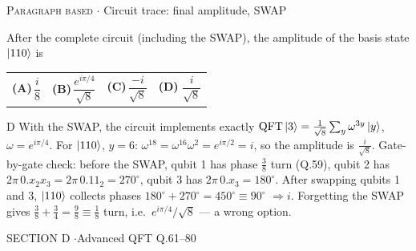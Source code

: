 \documentclass[11pt,a4paper]{article}
\newcommand{\optlabel}[1]{\textbf{(#1)}}
\newcommand{\correctlabel}[1]{\textcolor{okgreen}{\textbf{(#1)}\,\ding{51}}}
\newenvironment{qitem}[1]{\begin{list}{}{\setlength{\leftmargin}{3.3em}\setlength{\labelwidth}{3.1em}%
  \setlength{\labelsep}{0.2em}\setlength{\topsep}{3pt}\setlength{\parsep}{3pt}}\item[\textbf{Q.#1}\hfill]}{\end{list}}
\newcommand{\qsep}{\par\vspace{2pt}{\color{black!15}\hrule}\vspace{4pt}}
\newcommand{\qmeta}[2]{{\footnotesize\color{black!60}\textsc{#1} \;$\cdot$\; #2}\par}
\begin{document}
\begin{qitem}{60}
\qmeta{Paragraph based}{Circuit trace: final amplitude, SWAP}
After the complete circuit (including the SWAP), the amplitude of the basis state $\ket{110}$ is
\par\smallskip\noindent\begin{tabularx}{\linewidth}{@{}*{4}{L}@{}}
\optlabel{A}\,$\dfrac{i}{8}$ & \optlabel{B}\,$\dfrac{e^{i\pi/4}}{\sqrt8}$ & \optlabel{C}\,$\dfrac{-i}{\sqrt8}$ & \correctlabel{D}\,$\dfrac{i}{\sqrt8}$
\end{tabularx}
\end{qitem}
\begin{solbox}{D}
With the SWAP, the circuit implements exactly $\mathrm{QFT}\ket{3} = \frac{1}{\sqrt8}\sum_y\omega^{3y}\ket y$, $\omega = e^{i\pi/4}$.
For $\ket{110}$, $y = 6$: $\omega^{18} = \omega^{16}\omega^{2} = e^{i\pi/2} = i$, so the amplitude is $\frac{i}{\sqrt8}$.
Gate-by-gate check: before the SWAP, qubit 1 has phase $\frac38$ turn (Q.59), qubit 2 has $2\pi\,0.x_2x_3 = 2\pi\,0.11_2 = 270^\circ$,
qubit 3 has $2\pi\,0.x_3 = 180^\circ$. After swapping qubits 1 and 3, $\ket{110}$ collects phases $180^\circ + 270^\circ = 450^\circ \equiv 90^\circ$
$\Rightarrow i$. Forgetting the SWAP gives $\frac38 + \frac34 = \frac98 \equiv \frac18$ turn, i.e.\ $e^{i\pi/4}/\sqrt8$ --- a wrong option.
\end{solbox}
\qsep

\newpage

\begin{sectionbanner}SECTION D \enspace$\cdot$\enspace Advanced QFT \hfill Q.61--80\end{sectionbanner}
\end{document}
